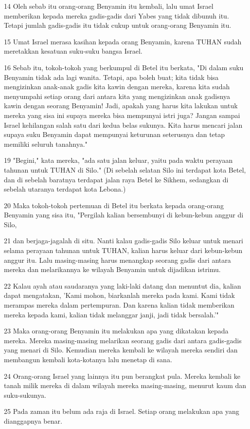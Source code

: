 \par 14 Oleh sebab itu orang-orang Benyamin itu kembali, lalu umat Israel memberikan kepada mereka gadis-gadis dari Yabes yang tidak dibunuh itu. Tetapi jumlah gadis-gadis itu tidak cukup untuk orang-orang Benyamin itu.
\par 15 Umat Israel merasa kasihan kepada orang Benyamin, karena TUHAN sudah meretakkan kesatuan suku-suku bangsa Israel.
\par 16 Sebab itu, tokoh-tokoh yang berkumpul di Betel itu berkata, "Di dalam suku Benyamin tidak ada lagi wanita. Tetapi, apa boleh buat; kita tidak bisa mengizinkan anak-anak gadis kita kawin dengan mereka, karena kita sudah menyumpahi setiap orang dari antara kita yang mengizinkan anak gadisnya kawin dengan seorang Benyamin! Jadi, apakah yang harus kita lakukan untuk mereka yang sisa ini supaya mereka bisa mempunyai istri juga? Jangan sampai Israel kehilangan salah satu dari kedua belas sukunya. Kita harus mencari jalan supaya suku Benyamin dapat mempunyai keturunan seterusnya dan tetap memiliki seluruh tanahnya."
\par 19 "Begini," kata mereka, "ada satu jalan keluar, yaitu pada waktu perayaan tahunan untuk TUHAN di Silo." (Di sebelah selatan Silo ini terdapat kota Betel, dan di sebelah baratnya terdapat jalan raya Betel ke Sikhem, sedangkan di sebelah utaranya terdapat kota Lebona.)
\par 20 Maka tokoh-tokoh pertemuan di Betel itu berkata kepada orang-orang Benyamin yang sisa itu, "Pergilah kalian bersembunyi di kebun-kebun anggur di Silo,
\par 21 dan berjaga-jagalah di situ. Nanti kalau gadis-gadis Silo keluar untuk menari selama perayaan tahunan untuk TUHAN, kalian harus keluar dari kebun-kebun anggur itu. Lalu masing-masing harus menangkap seorang gadis dari antara mereka dan melarikannya ke wilayah Benyamin untuk dijadikan istrimu.
\par 22 Kalau ayah atau saudaranya yang laki-laki datang dan menuntut dia, kalian dapat mengatakan, 'Kami mohon, biarkanlah mereka pada kami. Kami tidak merampas mereka dalam pertempuran. Dan karena kalian tidak memberikan mereka kepada kami, kalian tidak melanggar janji, jadi tidak bersalah.'"
\par 23 Maka orang-orang Benyamin itu melakukan apa yang dikatakan kepada mereka. Mereka masing-masing melarikan seorang gadis dari antara gadis-gadis yang menari di Silo. Kemudian mereka kembali ke wilayah mereka sendiri dan membangun kembali kota-kotanya lalu menetap di sana.
\par 24 Orang-orang Israel yang lainnya itu pun berangkat pula. Mereka kembali ke tanah milik mereka di dalam wilayah mereka masing-masing, menurut kaum dan suku-sukunya.
\par 25 Pada zaman itu belum ada raja di Israel. Setiap orang melakukan apa yang dianggapnya benar.


